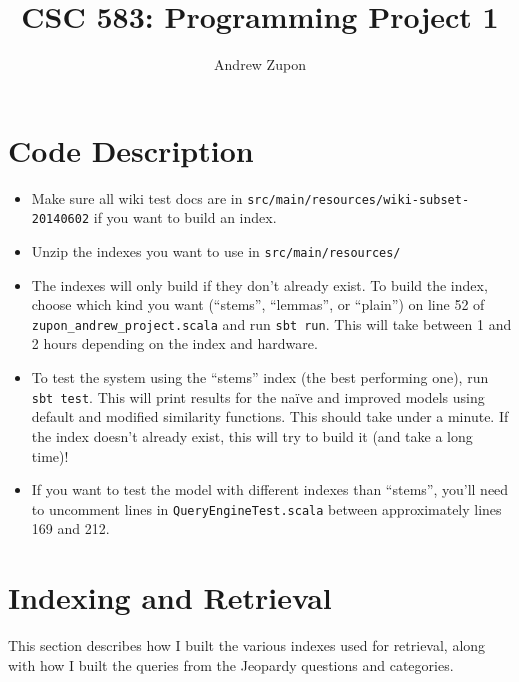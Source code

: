 \documentclass[11pt,letterpaper]{article}
\title{CSC 583: Programming Project 1}
\author{Andrew Zupon \\
}
\date{}
\begin{document}
	\maketitle
	

\section{Code Description}

\begin{itemize}
	\item Make sure all wiki test docs are in \texttt{src/main/resources/wiki-subset- 20140602} if you want to build an index.
	
	\item Unzip the indexes you want to use in \texttt{src/main/resources/}
	
	\item The indexes will only build if they don't already exist. To build the index, choose which kind you want (``stems'', ``lemmas'', or ``plain'') on line 52 of \texttt{zupon\_andrew\_project.scala} and run \texttt{sbt run}. This will take between 1 and 2 hours depending on the index and hardware.
	
	\item To test the system using the ``stems'' index (the best performing one), run \texttt{sbt test}. This will print results for the na\"ive and improved models using default and modified similarity functions. This should take under a minute. If the index doesn't already exist, this will try to build it (and take a long time)!
	
	\item If you want to test the model with different indexes than ``stems'', you'll need to uncomment lines in \texttt{QueryEngineTest.scala} between approximately lines 169 and 212.
\end{itemize}
	
	
\section{Indexing and Retrieval}
This section describes how I built the various indexes used for retrieval, along with how I built the queries from the Jeopardy questions and categories.
\end{document}
